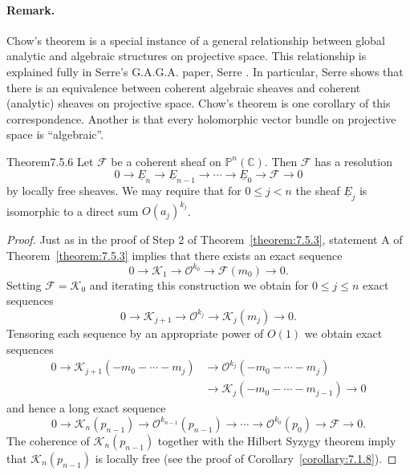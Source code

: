 \paragraph{Remark.} Chow's theorem is a special instance of a general relationship between global analytic and algebraic structures on projective space. This relationship is explained fully in Serre's G.A.G.A. paper, Serre \cite{bib:II:serre-j-p:3}. In particular, Serre shows that there is an equivalence between coherent algebraic sheaves and coherent (analytic) sheaves on projective space. Chow's theorem is one corollary of this correspondence. Another is that every holomorphic vector bundle on projective space is ``algebraic''.

\begin{originaltheorem}{Theorem}{7.5.6}
Let $\mathcal{F}$ be a coherent sheaf on $\mathbb{P}^n(\mathbb{C})$. Then $\mathcal{F}$ has a resolution
\[
0\to\underline{E}_n\to\underline{E}_{n-1}\to\cdots\to\underline{E}_0\to\mathcal{F}\to0
\]
by locally free sheaves. We may require that for $0\leq j<n$ the sheaf $\underline{E}_j$ is isomorphic to a direct sum $O(a_j)^{k_j}$.
\end{originaltheorem}
\begin{proof}
Just as in the proof of Step 2 of Theorem~\ref{theorem:7.5.3}, statement A of Theorem~\ref{theorem:7.5.3} implies that there exists an exact sequence
\[
0\to\mathcal{K}_1\to\mathcal{O}^{k_0}\to\mathcal{F}(m_0)\to0.
\]
Setting $\mathcal{F}=\mathcal{K}_0$ and iterating this construction we obtain for $0\leq j\leq n$ exact sequences
\[
0\to\mathcal{K}_{j+1}\to\mathcal{O}^{k_j}\to\mathcal{K}_j(m_j)\to0.
\]
Tensoring each sequence by an appropriate power of $O(1)$ we obtain exact sequences
\[
\begin{aligned}
0\to\mathcal{K}_{j+1}(-m_0-\cdots-m_j)&\to\mathcal{O}^{k_j}(-m_0-\cdots-m_j)\\
&\to\mathcal{K}_j(-m_0-\cdots-m_{j-1})\to0
\end{aligned}
\]
and hence a long exact sequence
\[
0\to\mathcal{K}_n(p_{n-1})\to\mathcal{O}^{k_{n-1}}(p_{n-1})\to\cdots\to\mathcal{O}^{k_0}(p_0)\to\mathcal{F}\to0.
\]
The coherence of $\mathcal{K}_n(p_{n-1})$ together with the Hilbert Syzygy theorem imply that $\mathcal{K}_n(p_{n-1})$ is locally free (see the proof of Corollary~\ref{corollary:7.1.8}).
\end{proof}

